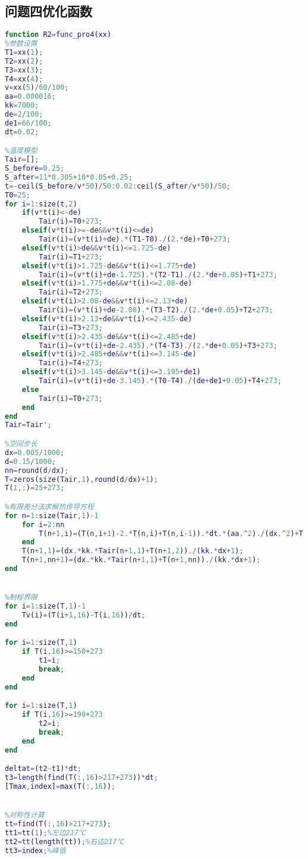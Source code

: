 \documentclass[12pt]{ctexart}
\numberwithin{figure}{section}
\numberwithin{table}{section}
\begin{document}
\subsection{问题四优化函数}
\begin{lstlisting}[language=MATLAB]
%问题四优化函数
function R2=func_pro4(xx)
%参数设置
T1=xx(1);
T2=xx(2);
T3=xx(3);
T4=xx(4);
v=xx(5)/60/100;
aa=0.000016;
kk=7000;
de=2/100;
de1=66/100;
dt=0.02;

%温度模型
Tair=[];
S_before=0.25;
S_after=11*0.305+10*0.05+0.25;
t=-ceil(S_before/v*50)/50:0.02:ceil(S_after/v*50)/50;
T0=25;
for i=1:size(t,2)
    if(v*t(i)<-de)
        Tair(i)=T0+273;
    elseif(v*t(i)>=-de&&v*t(i)<=de)
        Tair(i)=(v*t(i)+de).*(T1-T0)./(2.*de)+T0+273;
    elseif(v*t(i)>de&&v*t(i)<=1.725-de)
        Tair(i)=T1+273;
    elseif(v*t(i)>1.725-de&&v*t(i)<=1.775+de)
        Tair(i)=(v*t(i)+de-1.725).*(T2-T1)./(2.*de+0.05)+T1+273;
    elseif(v*t(i)>1.775+de&&v*t(i)<=2.08-de)
        Tair(i)=T2+273;
    elseif(v*t(i)>2.08-de&&v*t(i)<=2.13+de)
        Tair(i)=(v*t(i)+de-2.08).*(T3-T2)./(2.*de+0.05)+T2+273;
    elseif(v*t(i)>2.13+de&&v*t(i)<=2.435-de)
        Tair(i)=T3+273;
    elseif(v*t(i)>2.435-de&&v*t(i)<=2.485+de)
        Tair(i)=(v*t(i)+de-2.435).*(T4-T3)./(2.*de+0.05)+T3+273;
    elseif(v*t(i)>2.485+de&&v*t(i)<=3.145-de)
        Tair(i)=T4+273;
    elseif(v*t(i)>3.145-de&&v*t(i)<=3.195+de1)
        Tair(i)=(v*t(i)+de-3.145).*(T0-T4)./(de+de1+0.05)+T4+273;
    else
        Tair(i)=T0+273;
    end
end
Tair=Tair';

%空间步长
dx=0.005/1000;
d=0.15/1000;
nn=round(d/dx);
T=zeros(size(Tair,1),round(d/dx)+1);
T(1,:)=25+273;

%有限差分法求解热传导方程
for n=1:size(Tair,1)-1
    for i=2:nn
        T(n+1,i)=(T(n,i+1)-2.*T(n,i)+T(n,i-1)).*dt.*(aa.^2)./(dx.^2)+T(n,i);
    end
    T(n+1,1)=(dx.*kk.*Tair(n+1,1)+T(n+1,2))./(kk.*dx+1);
    T(n+1,nn+1)=(dx.*kk.*Tair(n+1,1)+T(n+1,nn))./(kk.*dx+1);
end


%制程界限
for i=1:size(T,1)-1
    Tv(i)=(T(i+1,16)-T(i,16))/dt;
end

for i=1:size(T,1)
    if T(i,16)>=150+273
        t1=i;
        break;
    end
end

for i=1:size(T,1)
    if T(i,16)>=190+273
        t2=i;
        break;
    end
end

deltat=(t2-t1)*dt;
t3=length(find(T(:,16)>217+273))*dt;
[Tmax,index]=max(T(:,16));


%对称性计算
tt=find(T(:,16)>217+273);
tt1=tt(1);%左边217℃
tt2=tt(length(tt));%右边217℃
tt3=index;%峰值


\end{lstlisting}
\end{document}
